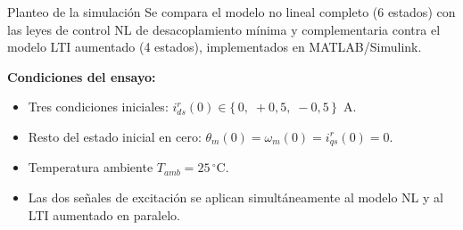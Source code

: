 \documentclass[aspectratio=169,t]{beamer}
\begin{document}
\begin{frame}{Planteo de la simulación}
{\small\color{uncGray}Se compara el modelo no lineal completo (6 estados) con las leyes de control NL de desacoplamiento mínima y complementaria contra el modelo LTI aumentado (4 estados), implementados en MATLAB/Simulink.}\par
\vspace{4mm}

\textbf{Condiciones del ensayo:}
\begin{itemize}
\item Tres condiciones iniciales: $i_{ds}^{r}(0) \in \{\,0,\;+0{,}5,\;-0{,}5\,\}$~A.
\item Resto del estado inicial en cero: $\theta_m(0) = \omega_m(0) = i_{qs}^{r}(0) = 0$.
\item Temperatura ambiente $T_{amb} = 25\,^\circ$C.
\item Las dos señales de excitación se aplican simultáneamente al modelo NL y al LTI aumentado en paralelo.
\end{itemize}
\end{frame}
\end{document}
